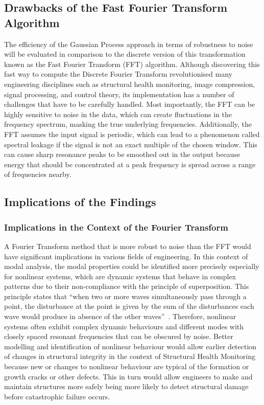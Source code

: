 \documentclass[12pt]{article}
\begin{document}
    \subsection{Drawbacks of the Fast Fourier Transform Algorithm}
    The efficiency of the Gaussian Process approach in terms of robustness to noise will be evaluated in comparison to the discrete version of this transformation known as the Fast Fourier Transform (FFT) algorithm.
    Although discovering this fast way to compute the Discrete Fourier Transform revolutionised many engineering disciplines such as structural health monitoring, image compression, signal processing, and control theory\cite{Byjus2023}, its implementation has a number of challenges that have to be carefully handled.
    Most importantly, the FFT can be highly sensitive to noise in the data, which can create fluctuations in the frequency spectrum, masking the true underlying frequencies\cite{MathStackExchange2023}.
    Additionally, the FFT assumes the input signal is periodic, which can lead to a phenomenon called spectral leakage if the signal is not an exact multiple of the chosen window\cite{MathStackExchange2023}.
    This can cause sharp resonance peaks to be smoothed out in the output because energy that should be concentrated at a peak frequency is spread across a range of frequencies nearby.

    \subsection{Implications of the Findings}

    \subsubsection{Implications in the Context of the Fourier Transform}

    A Fourier Transform method that is more robust to noise than the FFT would have significant implications in various fields of engineering.
    In this context of modal analysis, the modal properties could be identified more precisely especially for nonlinear systems, which are dynamic systems that behave in complex patterns due to their non-compliance with the principle of superposition.
    This principle states that ``when two or more waves simultaneously pass through a point, the disturbance at the point is given by the sum of the disturbances each wave would produce in absence of the other waves''~\cite{StudyComSuperposition}. %
    Therefore, nonlinear systems often exhibit complex dynamic behaviours and different modes with closely spaced resonant frequencies that can be obscured by noise.
    Better modelling and identification of nonlinear behaviour would allow earlier detection of changes in structural integrity in the context of Structural Health Monitoring because new or changes to nonlinear behaviour are typical of the formation or growth cracks or other defects.
    This in turn would allow engineers to make and maintain structures more safely being more likely to detect structural damage before catastrophic failure occurs.
\end{document}
